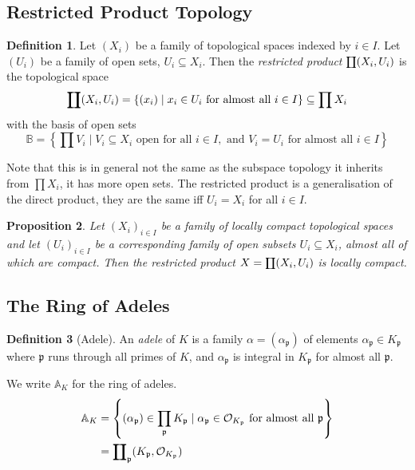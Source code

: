 \documentclass[11pt]{article}
\theoremstyle{definition}
\newtheorem{definition}{Definition}[section]
\theoremstyle{plain}
\newtheorem{proposition}[definition]{Proposition}
\theoremstyle{remark}
\newcommand{\bA}{\mathbb{A}}
\newcommand{\cO}{\mathcal{O}}
\newcommand{\fp}{\mathfrak{p}}
\newcommand{\rprod}{\mathrlap{\prod}{\coprod}}
\begin{document}
\subsection{Restricted Product Topology}

\begin{definition}\label{def:9_1}
    Let $(X_i)$ be a family of topological spaces indexed by $i \in I$. Let $(U_i)$ be a family of open sets, $U_i \subseteq X_i$. Then the \emph{restricted product} $\rprod (X_i, U_i)$ is the topological space
    \begin{equation*}
        \rprod(X_i, U_i) = \{(x_i) \mid x_i \in U_i \text{ for almost all } i \in I\} \subseteq \prod X_i
    \end{equation*}
    with the basis of open sets
    \begin{equation*}
        \mathbb{B} = \left\{\prod V_i \mid V_i \subseteq X_i \text{ open for all } i \in I, \text{ and } V_i = U_i \text{ for almost all } i \in I\right\}
    \end{equation*}
\end{definition}
Note that this is in general not the same as the subspace topology it inherits from $\prod X_i$, it has more open sets. The restricted product is a generalisation of the direct product, they are the same iff $U_i = X_i$ for all $i \in I$.

\begin{proposition}\label{prop:9_2}
    Let $(X_i)_{i \in I}$ be a family of locally compact topological spaces and let $(U_i)_{i \in I}$ be a corresponding family of open subsets $U_i \subseteq X_i$, almost all of which are compact. Then the restricted product $X = \rprod(X_i, U_i)$ is locally compact.
\end{proposition}

\subsection{The Ring of Adeles}

\begin{definition}[Adele]\label{def:9_3} An \emph{adele} of $K$ is a family $\alpha = (\alpha_\fp)$ of elements $\alpha_\fp \in K_\fp$ where $\fp$ runs through all primes of $K$, and $\alpha_\fp$ is integral in $K_\fp$ for almost all $\fp$.
\end{definition}
We write $\bA_K$ for the ring of adeles.
\begin{align*}
    \bA_K
    &= \left\{(\alpha_\fp) \in \prod_{\fp} K_\fp \mid \alpha_\fp \in \cO_{K_\fp} \text{ for almost all } \fp\right\}\\
    &= \rprod_{\fp} (K_\fp, \cO_{K_\fp})
\end{align*}
\end{document}
